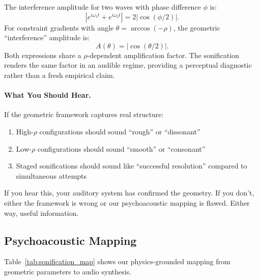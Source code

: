 \documentclass{article}
\theoremstyle{plain}
\theoremstyle{definition}
\theoremstyle{remark}
\begin{document}
The interference amplitude for two waves with phase difference $\phi$ is:
\[
|e^{i\omega_1 t} + e^{i\omega_2 t}| = 2|\cos(\phi/2)|.
\]
For constraint gradients with angle $\theta = \arccos(-\rho)$, the geometric ``interference'' amplitude is:
\[
A(\theta) = |\cos(\theta/2)|.
\]
Both expressions share a $\rho$-dependent amplification factor. The sonification renders the same factor in an audible regime, providing a perceptual diagnostic rather than a fresh empirical claim.

\paragraph{What You Should Hear.}
If the geometric framework captures real structure:
\begin{enumerate}
\item High-$\rho$ configurations should sound ``rough'' or ``dissonant''
\item Low-$\rho$ configurations should sound ``smooth'' or ``consonant''
\item Staged sonifications should sound like ``successful resolution'' compared to simultaneous attempts
\end{enumerate}
If you hear this, your auditory system has confirmed the geometry. If you don't, either the framework is wrong or our psychoacoustic mapping is flawed. Either way, useful information.

\subsection{Psychoacoustic Mapping}

Table~\ref{tab:sonification_map} shows our physics-grounded mapping from geometric parameters to audio synthesis.

\begin{table}[t]
\centering
\small
\caption{Physics-grounded mapping from geometric parameters to audio synthesis. The AM rate mapping places high-conflict sounds in the psychoacoustic ``roughness regime'' (20--70 Hz), following \citet{plomp1965tonal}.}
\label{tab:sonification_map}
\end{table}
\end{document}
